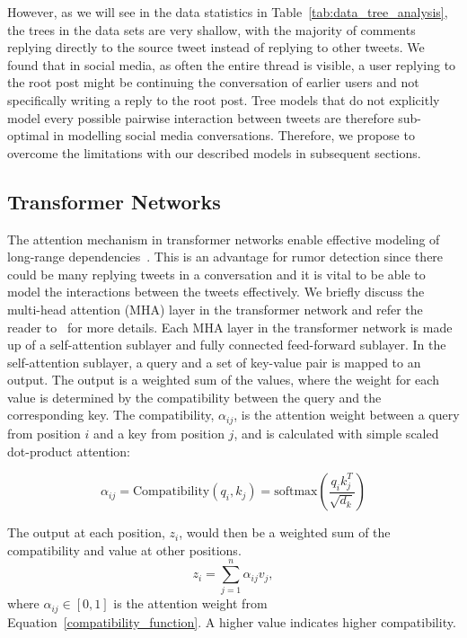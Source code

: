 \documentclass[letterpaper]{article} %
\begin{document}
However, as we will see in the data statistics in Table~\ref{tab:data_tree_analysis}, the trees in the data sets are very shallow, with the majority of comments replying directly to the source tweet instead of replying to other tweets. We found that in social media, as often the entire thread is visible, a user replying to the root post might be continuing the conversation of earlier users and not specifically writing a reply to the root post. Tree models that do not explicitly model every possible pairwise interaction between tweets are therefore sub-optimal in modelling social media conversations. Therefore, we propose to overcome the limitations with our described models in subsequent sections.

\subsection{Transformer Networks}
The attention mechanism in transformer networks enable effective modeling of long-range dependencies~\cite{DBLP:journals/corr/VaswaniSPUJGKP17}.
This is an advantage for rumor detection since there could be many replying tweets in a conversation and it is vital to be able to model the interactions between the tweets effectively. We briefly discuss the multi-head attention (MHA) layer in the transformer network and refer the reader to~\cite{DBLP:journals/corr/VaswaniSPUJGKP17} for more details.
Each MHA layer in the transformer network is made up of a self-attention sublayer and fully connected feed-forward sublayer.
In the self-attention sublayer, a query and a set of key-value pair is mapped to an output. The output is a weighted sum of the values, where the weight for each value is determined by the compatibility between the query and the corresponding key. The compatibility, $\alpha_{ij}$, is the attention weight between a query from position $i$ and a key from position $j$, and is calculated with simple scaled dot-product attention:

\begin{equation}
\alpha_{ij} = \mathrm{Compatibility}(q_{i}, k_{j}) = \mathrm{softmax}(\frac{q_{i}k_{j}^T}{\sqrt{d_{k}}}) \label{compatibility_function}
\end{equation}

The output at each position, $z_i$, would then be a weighted sum of the compatibility and value at other positions.
\begin{equation}
z_i = \sum_{j=1}^{n} \alpha_{ij} v_j, \label{weighted_sum}
\end{equation}
where $\alpha_{ij} \in [0,1]$ is the attention weight from Equation~\ref{compatibility_function}. A higher value indicates higher compatibility.
\end{document}
